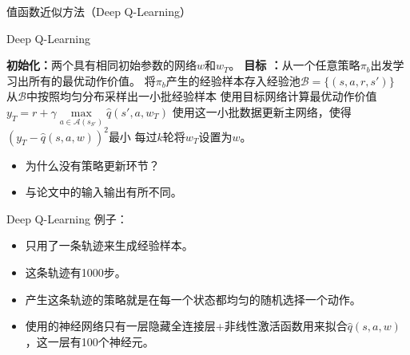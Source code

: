 \begin{section}{值函数近似方法\alert{（Deep Q-Learning）}}
\begin{frame}{Deep Q-Learning}
    \begin{algorithmic}[1]
        \State \textbf{初始化：}两个具有相同初始参数的网络$w$和$w_T$。
        \State \textbf{目标 ：}从一个任意策略$\pi_b$出发学习出所有的最优动作价值。
        \State 将$\pi_b$产生的经验样本存入经验池$\mathcal{B}=\{(s,a,r,s')\}$
            \State 从$\mathcal{B}$中按照均匀分布采样出一小批经验样本
                \State 使用目标网络计算最优动作价值$y_T= r+\gamma \underset{a\in \mathcal{A}(s_{S'})}{\max}\hat{q}(s',a,w_T)$
            \EndFor
            \State 使用这一小批数据更新主网络，使得$(y_T-\hat{q}(s,a,w))^2$最小
            \State 每过$k$轮将$w_T$设置为$w$。
        \EndFor
    \end{algorithmic}
    \begin{itemize}
        \item 为什么没有策略更新环节？
        \item 与论文中的输入输出有所不同。
    \end{itemize}
\end{frame}

\begin{frame}{Deep Q-Learning}
    例子：
    \begin{itemize}
        \item 只用了\alert{一条}轨迹来生成经验样本。
        \item 这条轨迹有1000步。
        \item 产生这条轨迹的策略就是在每一个状态都均匀的随机选择一个动作。
        \item 使用的神经网络只有一层隐藏全连接层+非线性激活函数用来拟合$\hat{q}(s,a,w)$，这一层有100个神经元。
    \end{itemize}
\end{frame}


\end{section}

